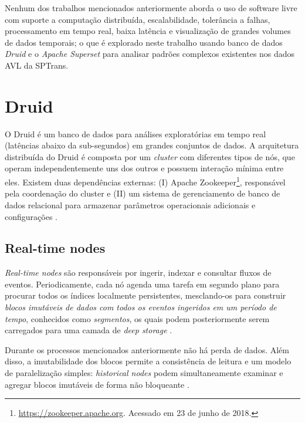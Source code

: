 \documentclass[
	12pt,				%
	oneside,			%
	a4paper,			%
	english,			%
	brazil				%
	]{abntex2ppgsi}
\begin{document}
{{Nenhum dos trabalhos mencionados anteriormente aborda o uso de software livre com suporte a computação distribuída, escalabilidade, tolerância a falhas, processamento em tempo real, baixa latência e visualização de grandes volumes de dados temporais; o que é explorado neste trabalho usando banco de dados \textit{Druid} e o \textit{Apache Superset} para analisar padrões complexos existentes nos dados AVL da SPTrans.

\section{Druid}
\label{druid}

O Druid é um banco de dados para análises exploratórias em tempo real (latências abaixo da sub-segundos) em grandes conjuntos de dados. A arquitetura distribuída do Druid é composta por um \textit{cluster} com diferentes tipos de nós, que operam independentemente uns dos outros e possuem interação mínima entre eles. Existem duas dependências externas: (I) Apache Zookeeper\footnote{\url{https://zookeeper.apache.org}. Acessado em 23 de junho de 2018.}, responsável pela coordenação do cluster e (II) um sistema de gerenciamento de banco de dados relacional  para armazenar parâmetros operacionais adicionais e configurações \cite{yang2014druid}.

\subsection{Real-time nodes}

\textit {Real-time nodes} são responsáveis por ingerir, indexar e consultar fluxos de eventos. Periodicamente, cada nó agenda uma tarefa em segundo plano para procurar todos os índices localmente persistentes, mesclando-os para construir \emph{blocos imutáveis de dados com todos os eventos ingeridos em um período de tempo}, conhecidos como \emph{segmentos}, os quais podem posteriormente serem carregados para uma camada de \textit {deep storage} \cite{yang2014druid}.

Durante os processos mencionados anteriormente não há perda de dados. Além disso, a imutabilidade dos blocos permite a consistência de leitura e um modelo de paralelização simples: \textit{historical nodes} podem simultaneamente examinar e agregar blocos imutáveis de forma não bloqueante \cite{yang2014druid}.

}}
\end{document}
